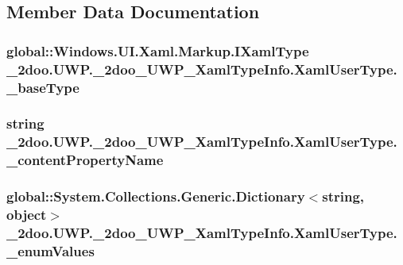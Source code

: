 \subsection{Member Data Documentation}
\hypertarget{class__2doo_1_1_u_w_p_1_1__2doo___u_w_p___xaml_type_info_1_1_xaml_user_type_41e7b6d8c2c2b546a3e4bdb931493306}{
\subsubsection[{\_\-baseType}]{\setlength{\rightskip}{0pt plus 5cm}global::Windows.UI.Xaml.Markup.IXamlType {\bf \_\-2doo.UWP.\_\-2doo\_\-UWP\_\-XamlTypeInfo.XamlUserType.\_\-baseType}}}
\label{class__2doo_1_1_u_w_p_1_1__2doo___u_w_p___xaml_type_info_1_1_xaml_user_type_41e7b6d8c2c2b546a3e4bdb931493306}


\hypertarget{class__2doo_1_1_u_w_p_1_1__2doo___u_w_p___xaml_type_info_1_1_xaml_user_type_6fb618b03a33c30e676d67a4d46ba28f}{
\subsubsection[{\_\-contentPropertyName}]{\setlength{\rightskip}{0pt plus 5cm}string {\bf \_\-2doo.UWP.\_\-2doo\_\-UWP\_\-XamlTypeInfo.XamlUserType.\_\-contentPropertyName}}}
\label{class__2doo_1_1_u_w_p_1_1__2doo___u_w_p___xaml_type_info_1_1_xaml_user_type_6fb618b03a33c30e676d67a4d46ba28f}


\hypertarget{class__2doo_1_1_u_w_p_1_1__2doo___u_w_p___xaml_type_info_1_1_xaml_user_type_a4ffefe44231ddcde5e003255d6d49b5}{
\subsubsection[{\_\-enumValues}]{\setlength{\rightskip}{0pt plus 5cm}global::System.Collections.Generic.Dictionary$<$string, object$>$ {\bf \_\-2doo.UWP.\_\-2doo\_\-UWP\_\-XamlTypeInfo.XamlUserType.\_\-enumValues}}}
\label{class__2doo_1_1_u_w_p_1_1__2doo___u_w_p___xaml_type_info_1_1_xaml_user_type_a4ffefe44231ddcde5e003255d6d49b5}


